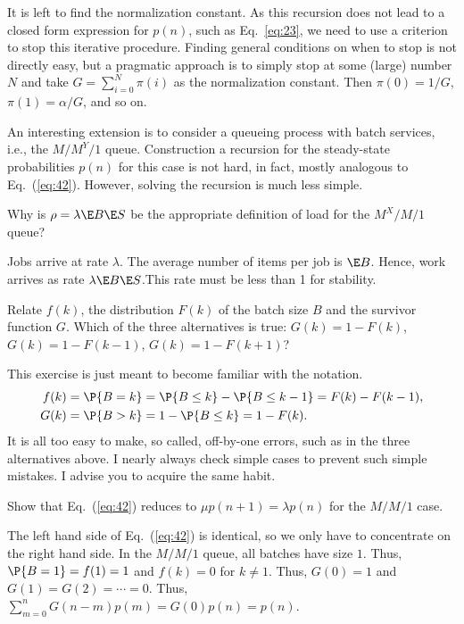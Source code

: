 It is left to find the normalization constant.  As this recursion does
not lead to a closed form expression for $p(n)$, such as
Eq.~\eqref{eq:23}, we need to use a criterion to stop this iterative
procedure. Finding general conditions on when to stop is not directly
easy, but a pragmatic approach is to simply stop at some (large)
number $N$ and take $G=\sum_{i=0}^N \pi(i)$ as the normalization
constant. Then $\pi(0)=1/G$, $\pi(1)=\alpha/G$, and so on.

\begin{remark}
  An interesting extension is to consider a queueing process with
  batch services, i.e., the $M/M^Y/1$ queue. Construction a recursion
  for the steady-state probabilities $p(n)$ for this case is not hard,
  in fact, mostly analogous to Eq.~(\ref{eq:42}).  However, solving
  the recursion is much less simple.
\end{remark}


\begin{question}
  Why is $\rho = \lambda \E B \E S$ be the appropriate definition
  of load for the $M^X/M/1$ queue?
  \begin{solution}
    Jobs arrive at rate $\lambda$. The average number of items per job
    is $\E B$. Hence, work arrives as rate $\lambda \E B \E S$.This
    rate must be less than 1 for stability.
  \end{solution}
\end{question}

\begin{question}
  Relate $f(k)$, the distribution $F(k)$ of the batch size $B$ and the
  survivor function $G$. Which of the three alternatives is true:
  $G(k) = 1-F(k)$, $G(k) = 1-F(k-1)$, $G(k) = 1-F(k+1)$?
  \begin{solution}
    This exercise is just meant to become familiar with the notation.
    \begin{align*}
    f(k) &= \P{B=k} = \P{B\leq k} - \P{B\leq k-1} = F(k)-F(k-1), \\
    G(k) &= \P{B>k} = 1 - \P{B\leq k} = 1-F(k).        
    \end{align*}
    It is all too easy to make, so called, off-by-one errors, such as
    in the three alternatives above.  I nearly always check simple
    cases to prevent such simple mistakes. I advise you to acquire the
    same habit.
  \end{solution}
\end{question}

\begin{question}
  Show that Eq.~(\ref{eq:42}) reduces to $\mu p(n+1)=\lambda p(n)$ for the $M/M/1$ case.
  \begin{solution}
    The left hand side of Eq.~(\ref{eq:42}) is identical, so we only
    have to concentrate on the right hand side. In the $M/M/1$ queue,
    all batches have size $1$. Thus, $\P{B=1} = f(1)=1$ and $f(k)=0$
    for $k\neq 1$. Thus, $G(0)=1$ and $G(1)=G(2)=\cdots = 0$. Thus,
    $\sum_{m=0}^n G(n-m) p(m) = G(0)p(n)=p(n)$.
  \end{solution}
\end{question}

